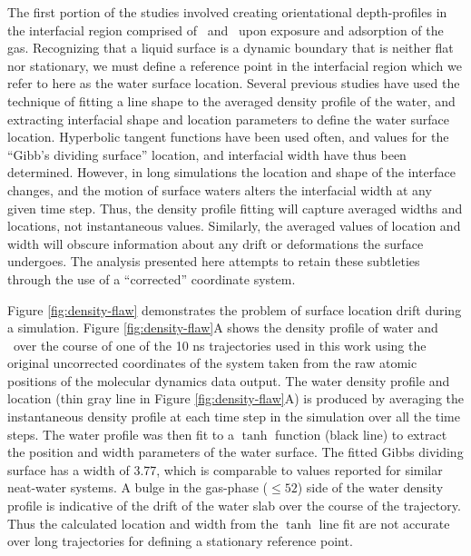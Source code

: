 	The first portion of the studies involved creating orientational depth-profiles in the interfacial region comprised of \suldiox~and \wat~upon exposure and adsorption of the gas. Recognizing that a liquid surface is a dynamic boundary that is neither flat nor stationary, we must define a reference point in the interfacial region which we refer to here as the water surface location. Several previous studies have used the technique of fitting a line shape to the averaged density profile of the water, and extracting interfacial shape and location parameters to define the water surface location.\cite{Shamay2010,Wick2006c,Chowdhary2006} Hyperbolic tangent functions have been used often, and values for the ``Gibb's dividing surface'' location, and interfacial width have thus been determined.\cite{Matsumoto1988} However, in long simulations the location and shape of the interface changes, and the motion of surface waters alters the interfacial width at any given time step. Thus, the density profile fitting will capture averaged widths and locations, not instantaneous values. Similarly, the averaged values of location and width will obscure information about any drift or deformations the surface undergoes. The analysis presented here attempts to retain these subtleties through the use of a ``corrected'' coordinate system.
	
Figure \ref{fig:density-flaw} demonstrates the problem of surface location drift during a simulation. Figure \ref{fig:density-flaw}A shows the density profile of water and \suldiox~over the course of one of the 10 ns trajectories used in this work using the original uncorrected coordinates of the system taken from the raw atomic positions of the molecular dynamics data output. The water density profile and location (thin gray line in Figure \ref{fig:density-flaw}A) is produced by averaging the instantaneous density profile at each time step in the simulation over all the time steps. The water profile was then fit to a $\tanh$ function (black line) to extract the position and width parameters of the water surface. The fitted Gibbs dividing surface has a width of 3.77\angs, which is comparable to values reported for similar neat-water systems.\cite{Dang1997,Hore2008} A bulge in the gas-phase ($\leq 52$\angs) side of the water density profile is indicative of the drift of the water slab over the course of the trajectory. Thus the calculated location and width from the $\tanh$ line fit are not accurate over long trajectories for defining a stationary reference point. 

